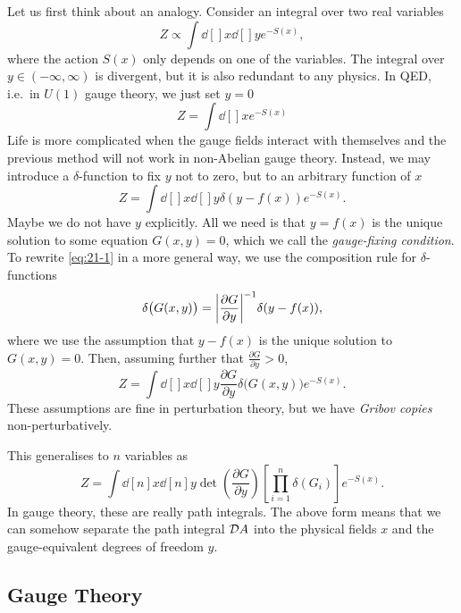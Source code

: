 Let us first think about an analogy. Consider an integral over two real variables
\begin{equation}
  Z \propto \int \dd[]{x} \dd[]{y} e^{-S(x)},
\end{equation}
where the action $S(x)$ only depends on one of the variables.
The integral over $y \in (-\infty, \infty)$ is divergent, but it is also redundant to any physics.
In QED, i.e.~in $U(1)$ gauge theory, we just set $y = 0$
\begin{equation}
  Z = \int \dd[]{x} e^{- S(x)}
\end{equation}
Life is more complicated when the gauge fields interact with themselves and the previous method will not work in non-Abelian gauge theory.
Instead, we may introduce a $\delta$-function to fix $y$ not to zero, but to an arbitrary function of $x$
\begin{equation}
  \label{eq:21-1}
  Z = \int \dd[]{x} \dd[]{y} \delta(y - f(x)) e^{-S(x)}.
\end{equation}
Maybe we do not have $y$ explicitly. All we need is that $y = f(x)$ is the unique solution to some equation $G(x, y) = 0$, which we call the \emph{gauge-fixing condition}.
To rewrite \eqref{eq:21-1} in a more general way, we use the composition rule for $\delta$-functions
\begin{equation}
  \delta\bigl(G(x, y)\bigr) = \abs{\frac{\partial G}{\partial y}}^{-1} \delta(y - f(x)),
\end{equation}
where we use the assumption that $y - f(x)$ is the unique solution to $G(x, y) = 0$.
Then, assuming further that $\frac{\partial G}{\partial y} > 0$, 
\begin{equation}
  Z = \int \dd[]{x} \dd[]{y} \frac{\partial G}{\partial y} \delta\bigl(G(x, y)\bigr) e^{-S(x)}.
\end{equation}
These assumptions are fine in perturbation theory, but we have \emph{Gribov copies} non-perturbatively.

This generalises to $n$ variables as
\begin{equation}
  Z = \int \dd[n]{x} \dd[n]{y} \det(\frac{\partial G}{\partial y}) \left[ \prod_{i = 1}^n \delta(G_i) \right] e^{-S(x)}.
\end{equation}
In gauge theory, these are really path integrals. The above form means that we can somehow separate the path integral $\mathop{\mathcal{D} A}$ into the physical fields $x$ and the gauge-equivalent degrees of freedom $y$.

\subsection{Gauge Theory}%
\label{sub:gauge_theory}

